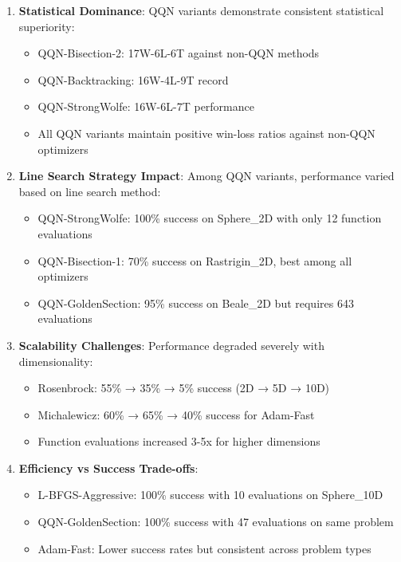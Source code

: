 \begin{enumerate}
\def\labelenumi{\arabic{enumi}.}
\tightlist
\item
  \textbf{Statistical Dominance}: QQN variants demonstrate consistent statistical superiority:

  \begin{itemize}
  \tightlist
  \item
    QQN-Bisection-2: 17W-6L-6T against non-QQN methods
  \item
    QQN-Backtracking: 16W-4L-9T record
  \item
    QQN-StrongWolfe: 16W-6L-7T performance
  \item
    All QQN variants maintain positive win-loss ratios against non-QQN optimizers
  \end{itemize}
\item
  \textbf{Line Search Strategy Impact}: Among QQN variants, performance varied based on line search method:

  \begin{itemize}
  \tightlist
  \item
    QQN-StrongWolfe: 100\% success on Sphere\_2D with only 12 function evaluations
  \item
    QQN-Bisection-1: 70\% success on Rastrigin\_2D, best among all optimizers
  \item
    QQN-GoldenSection: 95\% success on Beale\_2D but requires 643 evaluations
  \end{itemize}
\item
  \textbf{Scalability Challenges}: Performance degraded severely with dimensionality:

  \begin{itemize}
  \tightlist
  \item
    Rosenbrock: 55\% → 35\% → 5\% success (2D → 5D → 10D)
  \item
    Michalewicz: 60\% → 65\% → 40\% success for Adam-Fast
  \item
    Function evaluations increased 3-5x for higher dimensions
  \end{itemize}
\item
  \textbf{Efficiency vs Success Trade-offs}:

  \begin{itemize}
  \tightlist
  \item
    L-BFGS-Aggressive: 100\% success with 10 evaluations on Sphere\_10D
  \item
    QQN-GoldenSection: 100\% success with 47 evaluations on same problem
  \item
    Adam-Fast: Lower success rates but consistent across problem types
  \end{itemize}
\end{enumerate}

